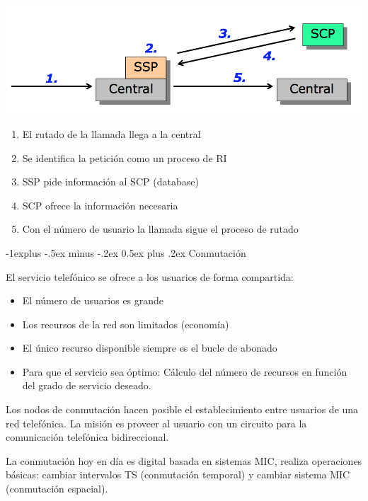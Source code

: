 \documentclass[10pt,portrait, twocolumn]{article}
\makeatletter
\renewcommand{\subsection}{\@startsection{subsection}{2}{0mm}%
                                {-1explus -.5ex minus -.2ex}%
                                {0.5ex plus .2ex}%
                                {\normalfont\normalsize\bfseries}}
\makeatother
\begin{document}
	\begin{center}
		\includegraphics[scale = 0.3]{INAP}
	\end{center}
	
	\begin{enumerate}
		\item El rutado de la llamada llega a la central
		\item Se identifica la petición como un proceso de RI
		\item SSP pide información al SCP (database)
		\item SCP ofrece la información necesaria
		\item Con el número de usuario la llamada sigue el proceso de rutado
	\end{enumerate}
	
\hrulefill

\subsection{Conmutación}

El servicio telefónico se ofrece a los usuarios de forma compartida:

	\begin{itemize}
		\item El número de usuarios es grande
		\item Los recursos de la red son limitados (economía)
		\item El único recurso disponible siempre es el bucle de abonado
		\item Para que el servicio sea óptimo: Cálculo del número de recursos en función del grado de servicio deseado.
	\end{itemize}
	
Los nodos de conmutación hacen posible el establecimiento entre usuarios de una red telefónica. La misión es proveer al usuario con un circuito para la comunicación telefónica bidireccional.

La conmutación hoy en día es digital basada en sistemas MIC, realiza operaciones básicas: cambiar intervalos TS (conmutación temporal) y cambiar sistema MIC (conmutación espacial).
\end{document}
